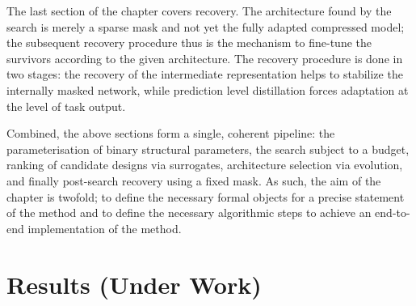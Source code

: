 \documentclass[11pt,a4paper,openany]{book}
\theoremstyle{definition}
\theoremstyle{remark}
\begin{document}
The last section of the chapter covers recovery. The architecture found by the search is merely a sparse mask and not yet the fully adapted compressed model; the subsequent recovery procedure thus is the mechanism to fine-tune the survivors according to the given architecture. The recovery procedure is done in two stages: the recovery of the intermediate representation helps to stabilize the internally masked network, while prediction level distillation forces adaptation at the level of task output. 

Combined, the above sections form a single, coherent pipeline: the parameterisation of binary structural parameters, the search subject to a budget, ranking of candidate designs via surrogates, architecture selection via evolution, and finally post-search recovery using a fixed mask. As such, the aim of the chapter is twofold; to define the necessary formal objects for a precise statement of the method and to define the necessary algorithmic steps to achieve an end-to-end implementation of the method.

\clearpage










\chapter{Results (Under Work)}












\end{document}
